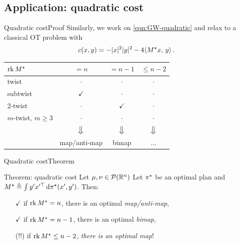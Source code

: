\documentclass[9pt,xcolor={dvipsnames}]{beamer}
\begin{document}
\subsection{Application: quadratic cost}
\begin{frame}{Quadratic cost}{Proof}
    Similarly, we work on \cref{eqn:GW-quadratic} and relax to a classical OT problem with $$c(x,y)=-|x|^2|y|^2-4\langle M^\star x,\,y\rangle\,.$$
    \begin{table}[h]
        \centering
        \begin{tabular}{lccc}
        $\operatorname*{rk} M^\star$ & $= n$ & $= n-1$    & $\leq n-2$ \\ \hline
        twist         & $\cdot$      & $\cdot$           & $\cdot$           \\
        subtwist      & $\checkmark$   & $\cdot$           &   $\cdot$         \\
        2-twist       & $\cdot$      & $\checkmark$        &  $\cdot$         \\
        $m$-twist, $m\geq3$ & $\cdot$      & $\cdot$        &  $\cdot$\\\pause
                            & $\big\Downarrow$ & $\big\Downarrow$ &  $\big\Downarrow$\\
                            & map/anti-map & bimap &  ...
        \end{tabular}
    \end{table}
\end{frame}
\begin{frame}{Quadratic cost}{Theorem}
    \begin{block}{Theorem: quadratic cost}
    Let $\mu, \nu\in \mathcal{P}(\mathbb{R}^n)$  Let $\pi^\star$ be an optimal plan and $M^\star\triangleq\int y' x'^\top \,\mathrm d\pi^\star(x', y')$. Then:
    \begin{itemize}
        \item[$\checkmark$] if $\operatorname*{rk} M^\star=n$, there is an optimal \emph{map/anti-map},
        \item[$\checkmark$] if $\operatorname*{rk} M^\star=n-1$, there is an optimal \emph{bimap},
        \item[(!!)] if $\operatorname*{rk} M^\star\leq n-2$, \emph{there is an optimal map}!
    \end{itemize}
    \end{block}
\end{frame}
\end{document}
